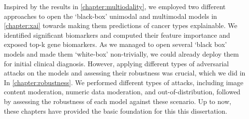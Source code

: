 \hspace*{5mm} Inspired by the results in \cref{chapter:multiodality}, we employed two different approaches to open the `black-box' unimodal and multimodal models in \cref{chapter:xai} towards making them predictions of cancer types explainable. We identified significant biomarkers and computed their feature importance and exposed top-k gene biomarkers. As we managed to open several `black box' models and made them `white-box' non-trivially, we could already deploy them for initial clinical diagnosis. However, applying different types of adversarial attacks on the models and assessing their robustness was crucial, which we did in In \cref{chapter:robustness}. We performed different types of attacks, including image content moderation, numeric data moderation, and out-of-distribution, followed by assessing the robustness of each model against these scenario. Up to now, these chapters have provided the basic foundation for this this dissertation. 
